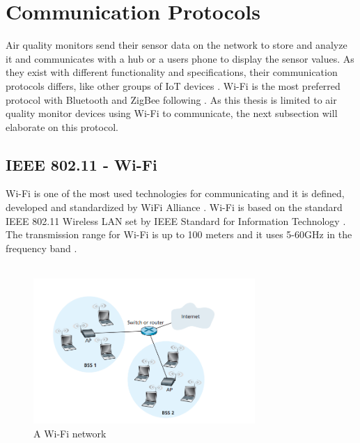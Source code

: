 \section{Communication Protocols}
Air quality monitors send their sensor data on the network to store and analyze it and communicates with a hub or a users phone to display the sensor values. As they exist with different functionality and specifications, their communication protocols differs, like other groups of \gls{IoT} devices \cite{AQMBigSource}. \gls{Wi-Fi} is the most preferred protocol with Bluetooth and ZigBee following \cite{saini2020indoor}. As this thesis is limited to air quality monitor devices using \gls{Wi-Fi} to communicate, the next subsection will elaborate on this protocol.

\subsection{IEEE 802.11 - Wi-Fi}
\gls{Wi-Fi} \cite{WiFiAlliance} is one of the most used technologies for communicating and it is defined, developed and standardized by WiFi Alliance \cite{WiFiAlliance}. \gls{Wi-Fi} is based on the standard IEEE 802.11 Wireless LAN set by IEEE Standard for Information Technology \cite{WifiStandard}. The transmission range for \gls{Wi-Fi} is up to 100 meters and it uses 5-60GHz in the frequency band \cite{IAQMonitorCommunicationReview}.
\\\\
\begin{figure} [H]
    \centering
    \includegraphics[width=0.75\textwidth]{figures/WiFiStandard.png}
    \caption{A Wi-Fi network \cite{Datacom}}
    \label{fig:WiFiStandard}
\end{figure}
